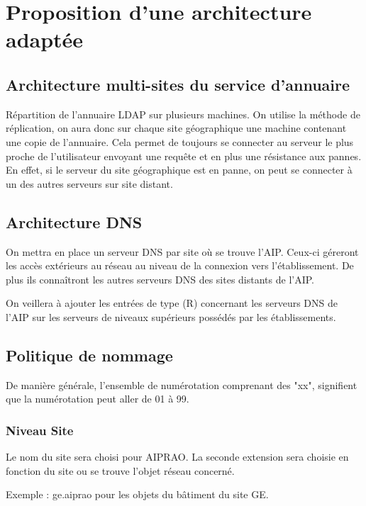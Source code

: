 \section{Proposition d'une architecture adaptée}

\subsection{Architecture multi-sites du service d'annuaire}

Répartition de l'annuaire LDAP sur plusieurs machines. On utilise la méthode de
réplication, on aura donc sur chaque site géographique une machine contenant 
une copie de l'annuaire. Cela permet de toujours se connecter au serveur le 
plus proche de l'utilisateur envoyant une requête et en plus une résistance 
aux pannes. En effet, si le serveur du site géographique est en panne, on peut
se connecter à un des autres serveurs sur site distant.

\subsection{Architecture DNS}

On mettra en place un serveur DNS par site où se trouve l'AIP. Ceux-ci géreront 
les accès extérieurs au réseau au niveau de la connexion vers l'établissement. 
De plus ils connaîtront les autres serveurs DNS des sites distants de l'AIP. 

On veillera à ajouter les entrées de type (R) concernant les serveurs DNS de l'AIP sur les 
serveurs de niveaux supérieurs possédés par les établissements. 

\subsection{Politique de nommage}

De manière générale, l'ensemble de numérotation comprenant des "xx", signifient 
que la numérotation peut aller de 01 à 99.

\subsubsection{Niveau Site}

Le nom du site sera choisi pour AIPRAO. La seconde extension sera choisie en fonction
du site ou se trouve l'objet réseau concerné. 

Exemple : ge.aiprao pour les objets du bâtiment du site GE. 

